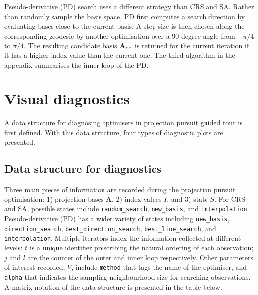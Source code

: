 Pseudo-derivative (PD) search uses a different strategy than CRS and SA.
Rather than randomly sample the basis space, PD first computes a search
direction by evaluating bases close to the current basis. A step size is
then chosen along the corresponding geodesic by another optimisation
over a 90 degree angle from \(-\pi/4\) to \(\pi/4\). The resulting
candidate basis \(\mathbf{A}_{**}\) is returned for the current
iteration if it has a higher index value than the current one. The third
algorithm in the appendix summarises the inner loop of the PD.

\hypertarget{vis-diag}{%
\section{Visual diagnostics}\label{vis-diag}}

A data structure for diagnosing optimisers in projection pursuit guided
tour is first defined. With this data structure, four types of
diagnostic plots are presented.

\hypertarget{data-structure-for-diagnostics}{%
\subsection{Data structure for
diagnostics}\label{data-structure-for-diagnostics}}

Three main pieces of information are recorded during the projection
pursuit optimisation: 1) projection bases \(\mathbf{A}\), 2) index
values \(I\), and 3) state \(S\). For CRS and SA, possible states
include \texttt{random\_search}, \texttt{new\_basis}, and
\texttt{interpolation}. Pseudo-derivative (PD) has a wider variety of
states including \texttt{new\_basis}, \texttt{direction\_search},
\texttt{best\_direction\_search}, \texttt{best\_line\_search}, and
\texttt{interpolation}. Multiple iterators index the information
collected at different levels: \(t\) is a unique identifier prescribing
the natural ordering of each observation; \(j\) and \(l\) are the
counter of the outer and inner loop respectively. Other parameters of
interest recorded, \(V\), include \texttt{method} that tags the name of
the optimiser, and \texttt{alpha} that indicates the sampling
neighbourhood size for searching observations. A matrix notation of the
data structure is presented in the table below.

\newpage

